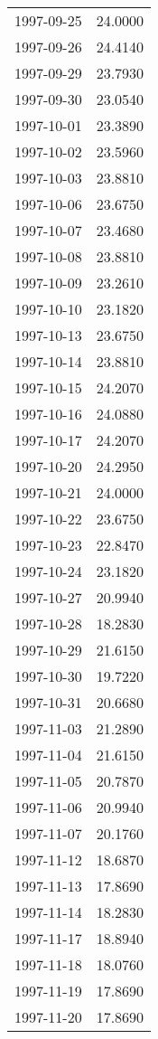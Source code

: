 \begin{tabular}{lr}
1997-09-25 &     24.0000 \\
1997-09-26 &     24.4140 \\
1997-09-29 &     23.7930 \\
1997-09-30 &     23.0540 \\
1997-10-01 &     23.3890 \\
1997-10-02 &     23.5960 \\
1997-10-03 &     23.8810 \\
1997-10-06 &     23.6750 \\
1997-10-07 &     23.4680 \\
1997-10-08 &     23.8810 \\
1997-10-09 &     23.2610 \\
1997-10-10 &     23.1820 \\
1997-10-13 &     23.6750 \\
1997-10-14 &     23.8810 \\
1997-10-15 &     24.2070 \\
1997-10-16 &     24.0880 \\
1997-10-17 &     24.2070 \\
1997-10-20 &     24.2950 \\
1997-10-21 &     24.0000 \\
1997-10-22 &     23.6750 \\
1997-10-23 &     22.8470 \\
1997-10-24 &     23.1820 \\
1997-10-27 &     20.9940 \\
1997-10-28 &     18.2830 \\
1997-10-29 &     21.6150 \\
1997-10-30 &     19.7220 \\
1997-10-31 &     20.6680 \\
1997-11-03 &     21.2890 \\
1997-11-04 &     21.6150 \\
1997-11-05 &     20.7870 \\
1997-11-06 &     20.9940 \\
1997-11-07 &     20.1760 \\
1997-11-12 &     18.6870 \\
1997-11-13 &     17.8690 \\
1997-11-14 &     18.2830 \\
1997-11-17 &     18.8940 \\
1997-11-18 &     18.0760 \\
1997-11-19 &     17.8690 \\
1997-11-20 &     17.8690 \\

\end{tabular}
